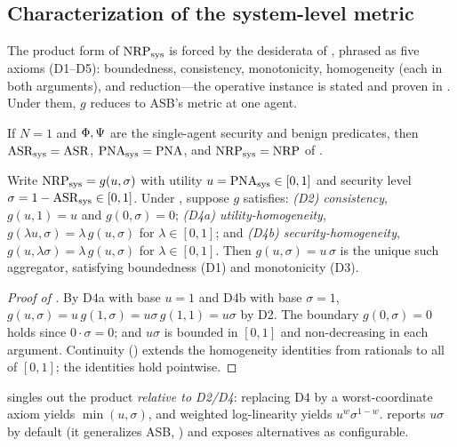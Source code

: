 \subsection{Characterization of the system-level metric}
\label{sec:theory-metric}
The product form of $\mathrm{NRP}_{\mathrm{sys}}$ is forced by the desiderata of , phrased as
five axioms (D1--D5): boundedness, consistency, monotonicity, homogeneity (each in both
arguments), and reduction---the operative instance is stated and proven in .
Under them, $g$ reduces to ASB's metric at one agent.

\begin{proposition}
\label{prop:reduction}
If $N=1$ and $\Phi,\Psi$ are the single-agent security and benign predicates,
then $\mathrm{ASR}_{\mathrm{sys}}=\mathrm{ASR}$, $\mathrm{PNA}_{\mathrm{sys}}=\mathrm{PNA}$, and $\mathrm{NRP}_{\mathrm{sys}}=\mathrm{NRP}$ of
.
\end{proposition}

\begin{theorem}
\label{thm:metric}
Write $\mathrm{NRP}_{\mathrm{sys}}=g(u,\sigma)$ with utility $u=\mathrm{PNA}_{\mathrm{sys}}\in[0,1]$ and security level
$\sigma=1-\mathrm{ASR}_{\mathrm{sys}}\in[0,1]$. Under , suppose $g$ satisfies:
\emph{(D2) consistency}, $g(u,1)=u$ and $g(0,\sigma)=0$;
\emph{(D4a) utility-homogeneity}, $g(\lambda u,\sigma)=\lambda\,g(u,\sigma)$ for
$\lambda\in[0,1]$; and
\emph{(D4b) security-homogeneity}, $g(u,\lambda\sigma)=\lambda\,g(u,\sigma)$ for
$\lambda\in[0,1]$.
Then $g(u,\sigma)=u\,\sigma$ is the unique such aggregator, satisfying boundedness (D1)
and monotonicity (D3).
\end{theorem}

\begin{proof}[Proof of ]
By D4a with base $u=1$ and D4b with base $\sigma=1$,
$g(u,\sigma)=u\,g(1,\sigma)=u\sigma\,g(1,1)=u\sigma$ by D2. The boundary $g(0,\sigma)=0$ holds
since $0\cdot\sigma=0$; and $u\sigma$ is bounded in $[0,1]$ and non-decreasing in each
argument. Continuity () extends the homogeneity identities from rationals to
all of $[0,1]$; the identities hold pointwise.
\end{proof}

\begin{remark}
\label{rem:metric}
 singles out the product \emph{relative to D2/D4}: replacing D4 by a
worst-coordinate axiom yields $\min(u,\sigma)$, and weighted log-linearity yields
$u^{w}\sigma^{1-w}$.  reports $u\sigma$ by default (it generalizes ASB,
) and exposes alternatives as configurable.
\end{remark}

